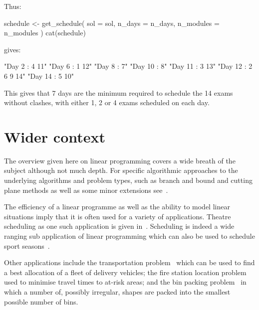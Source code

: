 Thus:

\begin{Rin-no-test}
schedule <- get_schedule(
  sol = sol,
  n_days = n_days,
  n_modules = n_modules
)
cat(schedule)
\end{Rin-no-test}

gives:

\begin{Rout-no-test}

 "Day 2 : 4 11"
 "Day 6 : 1 12"
 "Day 8 : 7"
 "Day 10 : 8"
 "Day 11 : 3 13"
 "Day 12 : 2 6 9 14"
 "Day 14 : 5 10"
\end{Rout-no-test}

This gives that 7 days are the minimum required to schedule the 14 exams without
clashes, with either 1, 2 or 4 exams scheduled on each day.

\section{Wider context}\label{sec:linear_programming_wider_context}

The overview given here on linear programming covers a wide breath of the subject
although not much depth. For specific algorithmic approaches to the underlying
algorithms and problem types, such as branch and bound and cutting plane methods
as well as some minor extensions see~\cite{conforti2014integer,
sultan2014linear}.

The efficiency of a linear programme as well as the ability to model
linear situations imply that it is often used for a variety of applications.
Theatre scheduling as one such application is given
in~\cite{guerriero2011operational}.
Scheduling is indeed a wide ranging sub application of linear programming
which can also be used to schedule sport
seasons~\cite{duran2007scheduling}.

Other applications include the transportation problem~\cite{diaz2014survey}
which can be used to find a best allocation of a fleet of delivery vehicles;
the fire station location problem~\cite{schreuder1981application} used to
minimise travel times to at-risk areas; and the bin packing
problem~\cite{hifi2010linear} in which a number of, possibly irregular,
shapes are packed into the smallest possible number of bins.
